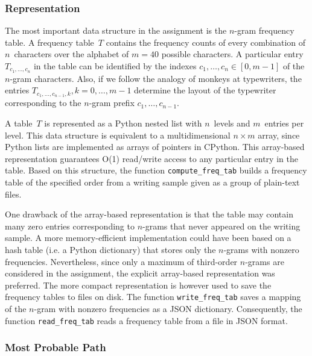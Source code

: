 \documentclass[conference]{IEEEtran}
\newcommand{\codeinline}[1]{{\fontsize{8}{0}\selectfont\texttt{#1}}}
\begin{document}
\vspace{0.5em}
\subsubsection{Representation}

The most important data structure in the assignment is the \mbox{$n$-gram} frequency table.
A frequency table~$T$ contains the frequency counts of every combination of $n$~characters over the alphabet of $m=40$ possible characters.
A particular entry $T_{c_1,\ldots,c_n}$ in the table can be identified by the indexes $c_1,\ldots,c_n \in [0,m-1]$ of the \mbox{$n$-gram} characters.
Also, if we follow the analogy of monkeys at typewriters, the entries $T_{c_1,\ldots,c_{n-1},k}, k=0,\ldots,m-1$ determine the layout of the typewriter corresponding to the \mbox{$n$-gram} prefix $c_1,\ldots,c_{n-1}$.

A table~$T$ is represented as a Python nested list with $n$~levels and $m$~entries per level.
This data structure is equivalent to a multidimensional $n \times m$ array, since Python lists are implemented as arrays of pointers in CPython.
This array-based representation guarantees O(1) read/write access to any particular entry in the table.
Based on this structure, the function \codeinline{compute\_freq\_tab} builds a frequency table of the specified order from a writing sample given as a group of plain-text files.

One drawback of the array-based representation is that the table may contain many zero entries corresponding to \mbox{\mbox{$n$-gram}s} that never appeared on the writing sample.
A more memory-efficient implementation could have been based on a hash table (i.e. a Python dictionary) that stores only the \mbox{\mbox{$n$-gram}s} with nonzero frequencies.
Nevertheless, since only a maximum of third-order \mbox{\mbox{$n$-gram}s} are considered in the assignment, the explicit array-based representation was preferred.
The more compact representation is however used to save the frequency tables to files on disk.
The function \codeinline{write\_freq\_tab} saves a mapping of the \mbox{$n$-gram} with nonzero frequencies as a JSON dictionary.
Consequently, the function \codeinline{read\_freq\_tab} reads a frequency table from a file in JSON format.


\vspace{0.5em}
\subsubsection{Most Probable Path}
\end{document}
